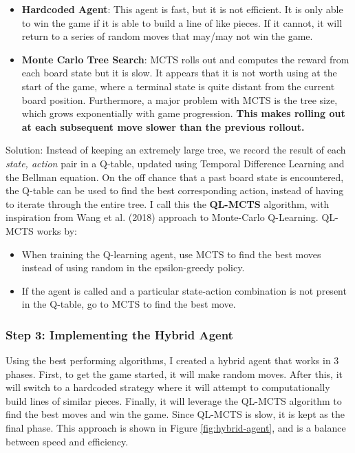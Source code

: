\begin{itemize}
    \item \textbf{Hardcoded Agent}: This agent is fast, but it is not efficient. It is only able to win the game if it is able to build a line of like pieces. If it cannot, it will return to a series of random moves that may/may not win the game.
    \item \textbf{Monte Carlo Tree Search}: MCTS rolls out and computes the reward from each board state but it is slow. It appears that it is not worth using at the start of the game, where a terminal state is quite distant from the current board position. Furthermore, a major problem with MCTS is the tree size, which grows exponentially with game progression. \textbf{This makes rolling out at each subsequent move slower than the previous rollout.} \\
\end{itemize}

Solution: Instead of keeping an extremely large tree, we record the result of each \textit{state, action} pair in a Q-table, updated using Temporal Difference Learning and the Bellman equation. On the off chance that a past board state is encountered, the Q-table can be used to find the best corresponding action, instead of having to iterate through the entire tree. I call this the \textbf{QL-MCTS} algorithm, with inspiration from Wang et al. (2018) approach to Monte-Carlo Q-Learning. QL-MCTS works by:

\begin{itemize}
    \item When training the Q-learning agent, use MCTS to find the best moves instead of using random in the epsilon-greedy policy.
    \item If the agent is called and a particular state-action combination is not present in the Q-table, go to MCTS to find the best move.
\end{itemize}

\subsubsection{Step 3: Implementing the Hybrid Agent}

Using the best performing algorithms, I created a hybrid agent that works in 3 phases. First, to get the game started, it will make random moves. After this, it will switch to a hardcoded strategy where it will attempt to computationally build lines of similar pieces. Finally, it will leverage the QL-MCTS algorithm to find the best moves and win the game. Since QL-MCTS is slow, it is kept as the final phase. This approach is shown in Figure \ref{fig:hybrid-agent}, and is a balance between speed and efficiency.

